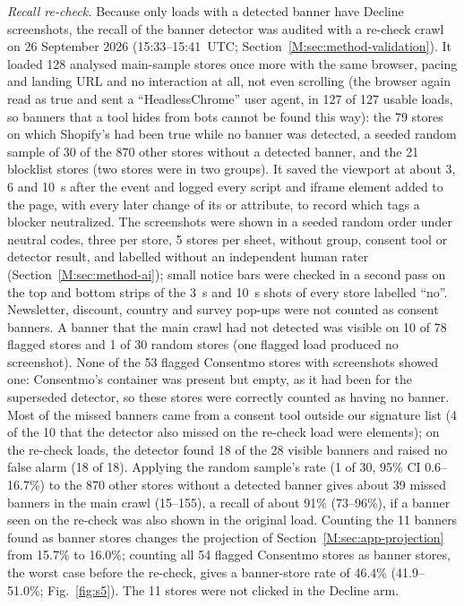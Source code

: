 \documentclass[preprint,11pt,authoryear,a4paper]{elsarticle}
\begin{document}
\emph{Recall re-check.} Because only loads with a detected banner have Decline screenshots, the recall of the banner detector was audited with a re-check crawl on 26 September 2026 (15:33--15:41~UTC; Section~\ref*{M:sec:method-validation}). It loaded 128 analysed main-sample stores once more with the same browser, pacing and landing URL and no interaction at all, not even scrolling (the browser again read  as true and sent a ``HeadlessChrome'' user agent, in 127 of 127 usable loads, so banners that a tool hides from bots cannot be found this way): the 79 stores on which Shopify's  had been true while no banner was detected, a seeded random sample of 30 of the 870 other stores without a detected banner, and the 21 blocklist stores (two stores were in two groups). It saved the viewport at about 3, 6 and 10~s after the  event and logged every script and iframe element added to the page, with every later change of its  or  attribute, to record which tags a blocker neutralized. The screenshots were shown in a seeded random order under neutral codes, three per store, 5 stores per sheet, without group, consent tool or detector result, and labelled without an independent human rater (Section~\ref*{M:sec:method-ai}); small notice bars were checked in a second pass on the top and bottom strips of the 3~s and 10~s shots of every store labelled ``no''. Newsletter, discount, country and survey pop-ups were not counted as consent banners. A banner that the main crawl had not detected was visible on 10 of 78 flagged stores and 1 of 30 random stores (one flagged load produced no screenshot). None of the 53 flagged Consentmo stores with screenshots showed one: Consentmo's container was present but empty, as it had been for the superseded detector, so these stores were correctly counted as having no banner. Most of the missed banners came from a consent tool outside our signature list (4 of the 10 that the detector also missed on the re-check load were  elements); on the re-check loads, the detector found 18 of the 28 visible banners and raised no false alarm (18 of 18). Applying the random sample's rate (1 of 30, 95\% CI 0.6--16.7\%) to the 870 other stores without a detected banner gives about 39 missed banners in the main crawl (15--155), a recall of about 91\% (73--96\%), if a banner seen on the re-check was also shown in the original load. Counting the 11 banners found as banner stores changes the projection of Section~\ref*{M:sec:app-projection} from 15.7\% to 16.0\%; counting all 54 flagged Consentmo stores as banner stores, the worst case before the re-check, gives a banner-store rate of 46.4\% (41.9--51.0\%; Fig.~\ref{fig:s5}). The 11 stores were not clicked in the Decline arm.
\end{document}
